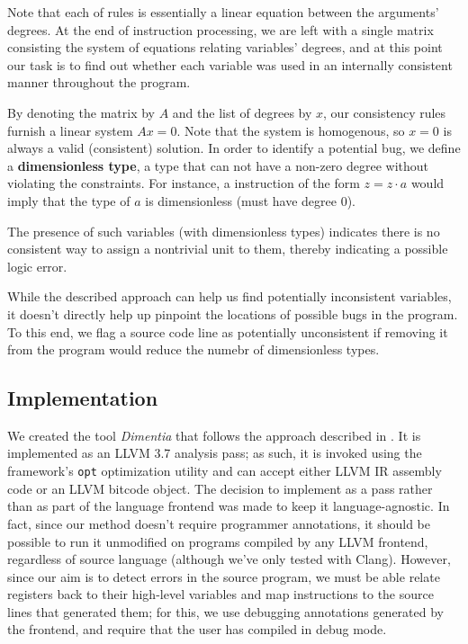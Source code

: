 \documentclass[12pt]{article}
\begin{document}
Note that each of rules is essentially a linear equation between the arguments' degrees. At the end of instruction processing, we are left with a single matrix consisting the system of equations relating variables' degrees, and at this point our task is to find out whether each variable was used in an internally consistent manner throughout the program.

By denoting the matrix by $A$ and the list of degrees by $x$, our consistency rules furnish a linear system $Ax = 0$. Note that the system is homogenous, so $x = 0$ is always a valid (consistent) solution. In order to identify a potential bug, we define a \textbf{dimensionless type}, a type that can not have a non-zero degree without violating the constraints. For instance, a instruction of the form $z = z \cdot a$ would imply that the type of $a$ is dimensionless (must have degree 0).

The presence of such variables (with dimensionless types) indicates there is no consistent way to assign a nontrivial unit to them, thereby indicating a possible logic error.

While the described approach can help us find potentially inconsistent variables, it doesn't directly help up pinpoint the locations of possible bugs in the program. To this end, we flag a source code line as potentially unconsistent if removing it from the program would reduce the numebr of dimensionless types.

\subsection{Implementation}

We created the tool \textit{Dimentia} that follows the approach described in . It is implemented as an LLVM 3.7 analysis pass; as such, it is invoked using the framework's \texttt{opt} optimization utility and can accept either LLVM IR assembly code or an LLVM bitcode object.
The decision to implement as a pass rather than as part of the language frontend was made to keep it language-agnostic.
In fact, since our method doesn't require programmer annotations, it should be possible to run it unmodified on programs compiled by any LLVM frontend, regardless of source language (although we've only tested with Clang).
However, since our aim is to detect errors in the source program, we must be able relate registers back to their high-level variables and map instructions to the source lines that generated them; for this, we use debugging annotations generated by the frontend, and require that the user has compiled in debug mode.
\end{document}

